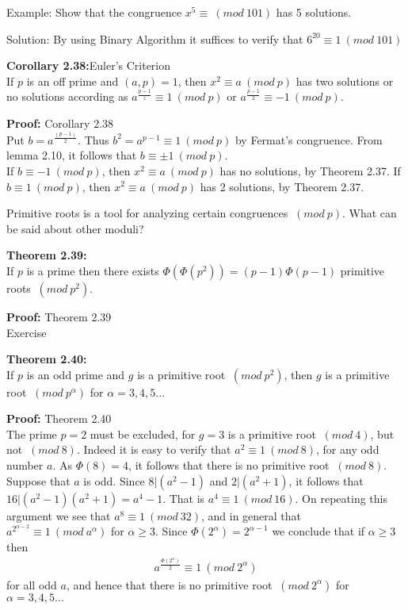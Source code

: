 \documentclass[a4paper]{article}
\begin{document}
Example: Show that the congruence $x^5 \equiv \ (mod\ 101)$ has 5 solutions.

Solution: By using Binary Algorithm it suffices to verify that $6^20 \equiv 1 \ (mod\ 101)$

\textbf{Corollary 2.38:}Euler's Criterion\\
If $p$ is an off prime and $(a,p)=1$, then $x^2 \equiv a \ (mod\ p)$ has two solutions or no solutions according as $a^\frac{p-1}{z} \equiv 1 \ (mod\ p)$ or $a^\frac{p-1}{2} \equiv -1 \ (mod\ p)$.

\textbf{Proof:} Corollary 2.38 \\
Put $b=a^{\frac{(p-1)}{2}}$. Thus $b^2=a^{p-1} \equiv 1 \ (mod\ p)$ by Fermat's congruence. From lemma 2.10, it follows that $b \equiv \pm 1 \ (mod\ p)$.\\
If $b \equiv -1 \ (mod\ p)$, then $x^2 \equiv a \ (mod\ p)$ has no solutions, by Theorem 2.37.
If $b \equiv 1 \ (mod\ p)$, then $x^2 \equiv a \ (mod\ p)$ has 2 solutions, by Theorem 2.37.

Primitive roots is a tool for analyzing certain congruences $\ (mod\ p)$. What can be said about other moduli?

\textbf{Theorem 2.39:}\\
If $p$ is a prime then there exists $\Phi(\Phi(p^2))=(p-1)\Phi(p-1)$ primitive roots $\ (mod\ p^2)$.

\textbf{Proof:} Theorem 2.39\\
Exercise

\textbf{Theorem 2.40:}\\
If $p$ is an odd prime and $g$ is a primitive root $\ (mod\ p^2)$, then $g$ is a primitive root $\ (mod\ p^{\alpha})$ for $\alpha = 3,4,5...$

\textbf{Proof:} Theorem 2.40\\
The prime $p=2$ must be excluded, for $g=3$ is a primitive root $\ (mod\ 4)$, but not $\ (mod\ 8)$. Indeed it is easy to verify that $a^2 \equiv 1 \ (mod\ 8)$, for any odd number $a$. As $\Phi(8)=4$, it follows that there is no primitive root $\ (mod\ 8)$.\\
Suppose that $a$ is odd. Since $8|(a^2-1)$ and $2|(a^2+1)$, it follows that $16|(a^2-1)(a^2+1)=a^4-1$. That is $a^4 \equiv 1 \ (mod\ 16)$. On repeating this argument we see that $a^8 \equiv 1 \ (mod\ 32)$, and in general that $a^2^{\alpha-2} \equiv 1 \ (mod\ a^{\alpha})$ for $\alpha \geq 3$. Since $\Phi(2^{\alpha})=2^{\alpha-1}$ we conclude that if $\alpha \geq 3$ then
\begin{align*}
     a^\frac{\Phi(2^{\alpha})}{2} \equiv 1 \ (mod\ 2^{\alpha})
\end{align*}
for all odd $a$, and hence that there is no primitive root $\ (mod\ 2^{\alpha})$ for $\alpha=3,4,5...$
\end{document}
